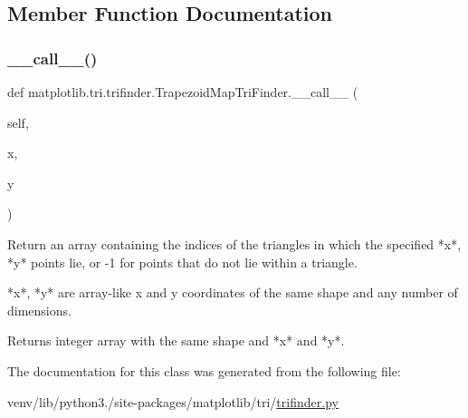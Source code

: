 \subsection{Member Function Documentation}
\mbox{\label{classmatplotlib_1_1tri_1_1trifinder_1_1TrapezoidMapTriFinder_a436a8dc63db017affc274e33c0b706fc}} 
\subsubsection{\texorpdfstring{\+\_\+\+\_\+call\+\_\+\+\_\+()}{\_\_call\_\_()}}
{\footnotesize\ttfamily def matplotlib.\+tri.\+trifinder.\+Trapezoid\+Map\+Tri\+Finder.\+\_\+\+\_\+call\+\_\+\+\_\+ (\begin{DoxyParamCaption}\item[{}]{self,  }\item[{}]{x,  }\item[{}]{y }\end{DoxyParamCaption})}

\begin{DoxyVerb}Return an array containing the indices of the triangles in which the
specified *x*, *y* points lie, or -1 for points that do not lie within
a triangle.

*x*, *y* are array-like x and y coordinates of the same shape and any
number of dimensions.

Returns integer array with the same shape and *x* and *y*.
\end{DoxyVerb}
 

The documentation for this class was generated from the following file\+:\begin{DoxyCompactItemize}
\item 
venv/lib/python3./site-\/packages/matplotlib/tri/\hyperlink{trifinder_8py}{trifinder.\+py}\end{DoxyCompactItemize}
